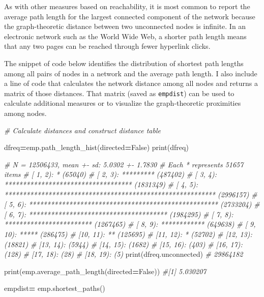 \documentclass[]{krantz}
\newenvironment{Shaded}{\begin{snugshade}}{\end{snugshade}}
\newcommand{\CommentTok}[1]{\textcolor[rgb]{0.56,0.35,0.01}{\textit{#1}}}
\newcommand{\VariableTok}[1]{\textcolor[rgb]{0.00,0.00,0.00}{#1}}
\newcommand{\OperatorTok}[1]{\textcolor[rgb]{0.81,0.36,0.00}{\textbf{#1}}}
\newcommand{\BuiltInTok}[1]{#1}
\newcommand{\NormalTok}[1]{#1}
\begin{document}
As with other measures based on reachability, it is most common to
report the average path length for the largest connected component of
the network because the graph-theoretic distance between two unconnected
nodes is infinite. In an electronic network such as the World Wide Web,
a shorter path length means that any two pages can be reached through
fewer hyperlink clicks.

The snippet of code below identifies the distribution of shortest path
lengths among all pairs of nodes in a network and the average path
length. I also include a line of code that calculates the network
distance among all nodes and returns a matrix of those distances. That
matrix (saved as \texttt{empdist}) can be used to calculate additional
measures or to visualize the graph-theoretic proximities among nodes.

\begin{Shaded}
\begin{Highlighting}[]
\CommentTok{# Calculate distances and construct distance table}

\NormalTok{dfreq}\OperatorTok{=}\NormalTok{emp.path_length_hist(directed}\OperatorTok{=}\VariableTok{False}\NormalTok{)}
\BuiltInTok{print}\NormalTok{(dfreq)}

\CommentTok{# N = 12506433, mean +- sd: 5.0302 +- 1.7830}
\CommentTok{# Each * represents 51657 items}
\CommentTok{# [ 1,  2): * (65040)}
\CommentTok{# [ 2,  3): ********* (487402)}
\CommentTok{# [ 3,  4): *********************************** (1831349)}
\CommentTok{# [ 4,  5): ********************************************************** (2996157)}
\CommentTok{# [ 5,  6): **************************************************** (2733204)}
\CommentTok{# [ 6,  7): ************************************** (1984295)}
\CommentTok{# [ 7,  8): ************************ (1267465)}
\CommentTok{# [ 8,  9): ************ (649638)}
\CommentTok{# [ 9, 10): ***** (286475)}
\CommentTok{# [10, 11): ** (125695)}
\CommentTok{# [11, 12): * (52702)}
\CommentTok{# [12, 13):  (18821)}
\CommentTok{# [13, 14):  (5944)}
\CommentTok{# [14, 15):  (1682)}
\CommentTok{# [15, 16):  (403)}
\CommentTok{# [16, 17):  (128)}
\CommentTok{# [17, 18):  (28)}
\CommentTok{# [18, 19):  (5)}
\BuiltInTok{print}\NormalTok{(dfreq.unconnected)}
\CommentTok{# 29864182}

\BuiltInTok{print}\NormalTok{(emp.average_path_length(directed}\OperatorTok{=}\VariableTok{False}\NormalTok{))}
\CommentTok{#[1] 5.030207}

\NormalTok{empdist}\OperatorTok{=}\NormalTok{ emp.shortest_paths()}
\end{Highlighting}
\end{Shaded}
\end{document}
